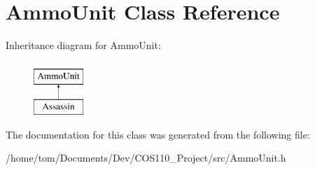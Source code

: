 \hypertarget{classAmmoUnit}{\section{Ammo\-Unit Class Reference}
\label{classAmmoUnit}
}
Inheritance diagram for Ammo\-Unit\-:\begin{figure}[H]
\begin{center}
\leavevmode
\includegraphics[height=2.000000cm]{classAmmoUnit}
\end{center}
\end{figure}


The documentation for this class was generated from the following file\-:\begin{DoxyCompactItemize}
\item 
/home/tom/\-Documents/\-Dev/\-C\-O\-S110\-\_\-\-Project/src/Ammo\-Unit.\-h\end{DoxyCompactItemize}

